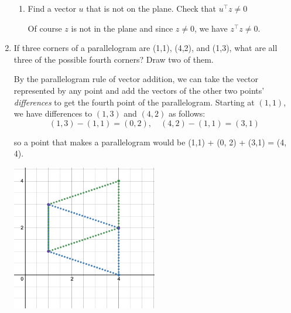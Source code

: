 \documentclass{scrartcl}
\begin{document}
\begin{enumerate}
\begin{enumerate}
\item Find a vector $u$ that is not on the plane. Check that $u^\top z \neq 0$


	Of course $z$ is not in the plane and since $z \neq 0$, we have $z^\top z \neq 0$.
\end{enumerate}

\item If three corners of a parallelogram are (1,1), (4,2), and (1,3), what are all three of the possible fourth corners? Draw two of them.

By the parallelogram rule of vector addition, we can take the vector represented by any point and add the vectors of the other two points' \emph{differences} to get the fourth point of the parallelogram. Starting at $(1,1)$, we have differences to $(1, 3)$ and $(4,2)$ as follows:
$$(1,3) - (1,1) = (0, 2), \quad (4,2) - (1,1) = (3,1)$$

so a point that makes a parallelogram would be (1,1) + (0, 2) + (3,1) = (4, 4).
\begin{center}
	\includegraphics[width=0.5\textwidth]{imgs/1.1.6.png}
\end{center}
\end{enumerate}
\end{document}
